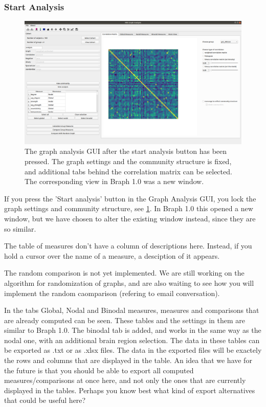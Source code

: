 \documentclass{article}
\begin{document}
\subsubsection{Start Analysis}
\label{sec:start_analysis}

\begin{figure}[h]
    \centering
    \includegraphics[width=\linewidth]{start_analysis.png}
    \caption{The graph analysis GUI after the start analysis button has been pressed. The graph settings and the community structure is fixed, and additional tabs behind the correlation matrix can be selected. The corresponding view in Braph 1.0 was a new window.}
    \label{fig:start_analysis}
\end{figure}

If you press the 'Start analysis' button in the Graph Analysis GUI, you lock the graph settings and community structure, see \cref{fig:start_analysis}. In Braph 1.0 this opened a new window, but we have chosen to alter the existing window instead, since they are so similar. 

The table of measures don't have a column of descriptions here. Instead, if you hold a cursor over the name of a measure, a desciption of it appears. 

The random comparison is not yet implemented. We are still working on the algorithm for randomization of graphs, and are also waiting to see how you will implement the random caomparison (refering to email conversation).

In the tabs Global, Nodal and Binodal measures, measures and comparisons that are already computed can be seen. These tables and the settings in them are similar to Braph 1.0. The binodal tab is added, and works in the same way as the nodal one, with an additional brain region selection. The data in these tables can be exported as .txt or as .xlsx files. The data in the exported files will be exactely the rows and columns that are displayed in the table. An idea that we have for the future is that you should be able to export all computed measures/comparisons at once here, and not only the ones that are currently displayed in the tables. Perhaps you know best what kind of export alternatives that could be useful here?
\end{document}
